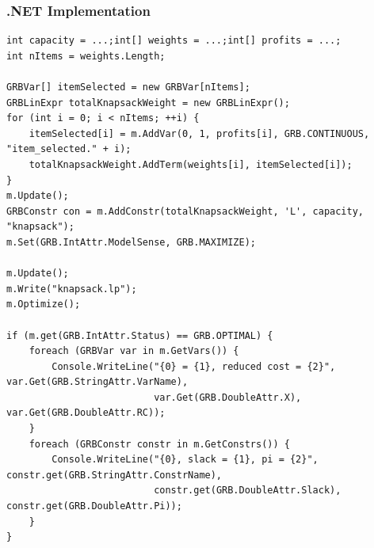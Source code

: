 \documentclass[12pt,handout]{beamer}
\begin{document}
\begin{frame} [containsverbatim]
\frametitle{.NET Implementation}
\tiny
\begin{verbatim}
int capacity = ...;int[] weights = ...;int[] profits = ...;
int nItems = weights.Length;

GRBVar[] itemSelected = new GRBVar[nItems];
GRBLinExpr totalKnapsackWeight = new GRBLinExpr();
for (int i = 0; i < nItems; ++i) {
    itemSelected[i] = m.AddVar(0, 1, profits[i], GRB.CONTINUOUS, "item_selected." + i);
    totalKnapsackWeight.AddTerm(weights[i], itemSelected[i]);
}
m.Update();
GRBConstr con = m.AddConstr(totalKnapsackWeight, 'L', capacity, "knapsack");
m.Set(GRB.IntAttr.ModelSense, GRB.MAXIMIZE);

m.Update();
m.Write("knapsack.lp");
m.Optimize();

if (m.get(GRB.IntAttr.Status) == GRB.OPTIMAL) {
    foreach (GRBVar var in m.GetVars()) {
        Console.WriteLine("{0} = {1}, reduced cost = {2}", var.Get(GRB.StringAttr.VarName),
                          var.Get(GRB.DoubleAttr.X), var.Get(GRB.DoubleAttr.RC));
    }
    foreach (GRBConstr constr in m.GetConstrs()) {
        Console.WriteLine("{0}, slack = {1}, pi = {2}", constr.get(GRB.StringAttr.ConstrName),
                          constr.get(GRB.DoubleAttr.Slack), constr.get(GRB.DoubleAttr.Pi));
    }
}
\end{verbatim}
\end{frame}

\end{document}
